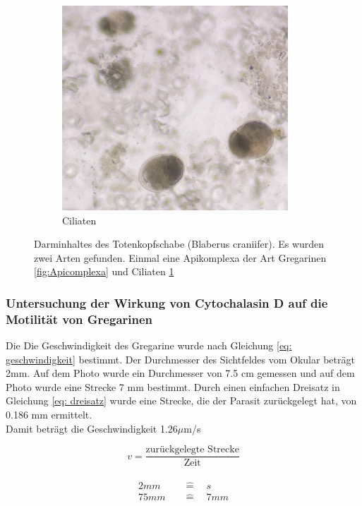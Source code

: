 \documentclass[oneside,10pt,a4paper]{report}
\begin{document}
\begin{figure}[H]
\begin{subfigure}[b]{0.5\textwidth}
							\includegraphics[width=\textwidth]{ciliaten.jpg}
							\caption{Ciliaten}
							\label{fig: Ciliaten}
						\end{subfigure}
						\caption{Darminhaltes des Totenkopfschabe (Blaberus craniifer). Es wurden zwei Arten gefunden. Einmal eine Apikomplexa der Art Gregarinen \ref{fig:Apicomplexa} und Ciliaten \ref{fig: Ciliaten}}
						\label{fig: Blaberus_darm}
					\end{figure}
					
					

			\subsubsection{Untersuchung der Wirkung von Cytochalasin D auf die Motilität von Gregarinen}
				Die Die Geschwindigkeit des Gregarine wurde nach Gleichung \ref{eq: geschwindigkeit} bestimmt. Der Durchmesser des Sichtfeldes vom Okular beträgt 2mm. Auf dem Photo wurde ein Durchmesser von 7.5 cm gemessen und auf dem Photo wurde eine Strecke 7 mm bestimmt. Durch einen einfachen Dreisatz in Gleichung \ref{eq: dreisatz} wurde eine Strecke, die der Parasit zurückgelegt hat, von 0.186 mm ermittelt.\\
				Damit beträgt die Geschwindigkeit 1.26$\mu$m/s
				
				\begin{equation}\label{eq: geschwindigkeit}
					v = \frac{\text{zurückgelegte Strecke}}{\text{Zeit}}
				\end{equation}
				\\
				\begin{equation}\label{eq: dreisatz}
					\begin{split}
						2 mm &\quad\widehat{=}\quad s\\
						75 mm  &\quad\widehat{=}\quad 7 mm
					\end{split}
				\end{equation}
				
\end{document}
